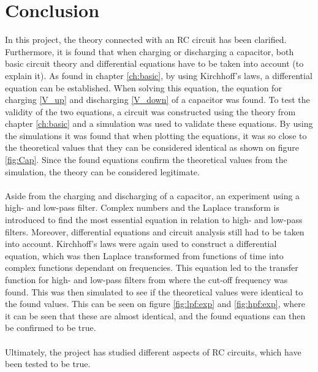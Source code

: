 \chapter{Conclusion}
In this project, the theory connected with an RC circuit has been clarified. Furthermore, it is found that when charging or discharging a capacitor, both basic circuit theory and differential equations have to be taken into account (to explain it). As found in chapter \ref{ch:basic}, by using Kirchhoff's laws, a differential equation can be established. When solving this equation, the equation for charging \eqref{V_up} and discharging \eqref{V_down} of a capacitor was found. To test the validity of the two equations, a circuit was constructed using the theory from chapter \ref{ch:basic} and a simulation was used to validate these equations. By using the simulations it was found that when plotting the equations, it was so close to the theoretical values that they can be considered identical as shown on figure \ref{fig:Cap}. Since the found equations confirm the theoretical values from the simulation, the theory can be considered legitimate. 
\\ \\
Aside from the charging and discharging of a capacitor, an experiment using a high- and low-pass filter. Complex numbers and the Laplace transform is introduced to find the most essential equation in relation to high- and low-pass filters. Moreover, differential equations and circuit analysis still had to be taken into account. Kirchhoff's laws were again used to construct a differential equation, which was then Laplace transformed from functions of time into complex functions dependant on frequencies. This equation led to the transfer function for high- and low-pass filters from where the cut-off frequency was found. This was then simulated to see if the theoretical values were identical to the found values. This can be seen on figure \ref{fig:lpf:exp} and \ref{fig:hpf:exp}, where it can be seen that these are almost identical, and the found equations can then be confirmed to be true. 
\\ \\
Ultimately, the project has studied different aspects of RC circuits, which have been tested to be true. 
